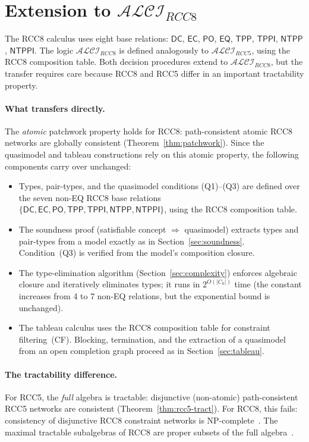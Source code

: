 \documentclass[a4paper,11pt]{article}
\theoremstyle{definition}
\newcommand{\ALCIRCC}[1]{\ensuremath{\mathcal{ALCI}_{\mathit{RCC#1}}}}
\newcommand{\PO}{\ensuremath{\mathsf{PO}}}
\newcommand{\EQ}{\ensuremath{\mathsf{EQ}}}
\newcommand{\DC}{\ensuremath{\mathsf{DC}}}
\newcommand{\EC}{\ensuremath{\mathsf{EC}}}
\newcommand{\TPP}{\ensuremath{\mathsf{TPP}}}
\newcommand{\TPPI}{\ensuremath{\mathsf{TPPI}}}
\newcommand{\NTPP}{\ensuremath{\mathsf{NTPP}}}
\newcommand{\NTPPI}{\ensuremath{\mathsf{NTPPI}}}
\newcommand{\NP}{\textsc{NP}}
\begin{document}
\section{Extension to $\ALCIRCC{8}$}
\label{sec:rcc8}

The RCC8 calculus uses eight base relations: $\DC$, $\EC$, $\PO$,
$\EQ$, $\TPP$, $\TPPI$, $\NTPP$, $\NTPPI$.  The logic $\ALCIRCC{8}$
is defined analogously to $\ALCIRCC{5}$, using the RCC8 composition
table.  Both decision procedures extend to $\ALCIRCC{8}$, but the
transfer requires care because RCC8 and RCC5 differ in an important
tractability property.

\paragraph{What transfers directly.}
The \emph{atomic} patchwork property holds for RCC8: path-consistent
atomic RCC8 networks are globally consistent
(Theorem~\ref{thm:patchwork}).  Since the quasimodel and tableau
constructions rely on this atomic property, the following components
carry over unchanged:
\begin{itemize}[nosep]
  \item Types, pair-types, and the quasimodel conditions
    (Q1)--(Q3) are defined over the seven non-EQ RCC8 base relations
    $\{\DC, \EC, \PO, \TPP, \TPPI, \NTPP, \NTPPI\}$, using the RCC8
    composition table.
  \item The soundness proof (satisfiable concept $\Rightarrow$
    quasimodel) extracts types and pair-types from a model exactly as
    in Section~\ref{sec:soundness}.  Condition~(Q3) is verified from
    the model's composition closure.
  \item The type-elimination algorithm
    (Section~\ref{sec:complexity}) enforces algebraic closure and
    iteratively eliminates types; it runs in $2^{O(|C_0|)}$ time (the
    constant increases from 4 to 7 non-EQ relations, but the
    exponential bound is unchanged).
  \item The tableau calculus uses the RCC8 composition table for
    constraint filtering~(CF).  Blocking, termination, and the
    extraction of a quasimodel from an open completion graph proceed
    as in Section~\ref{sec:tableau}.
\end{itemize}

\paragraph{The tractability difference.}
For RCC5, the \emph{full} algebra is tractable: disjunctive
(non-atomic) path-consistent RCC5 networks are consistent
(Theorem~\ref{thm:rcc5-tract}).  For RCC8, this fails:
consistency of disjunctive RCC8 constraint networks is
\NP-complete~\cite{RenzNebel1999}.  The maximal tractable
subalgebras of RCC8 are proper subsets of the full
algebra~\cite{Renz1999}.
\end{document}
